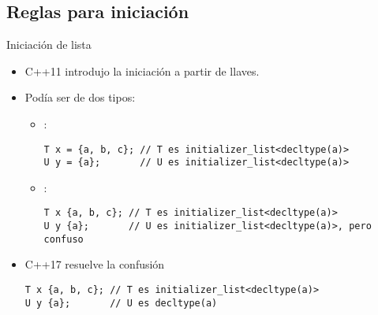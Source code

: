 \subsection{Reglas para iniciación}

\begin{frame}[t,fragile]{Iniciación de lista}
\begin{itemize}
  \item C++11 introdujo la iniciación a partir de llaves.
  \item Podía ser de dos tipos:
    \begin{itemize}
      \item {}:
\begin{lstlisting}
T x = {a, b, c}; // T es initializer_list<decltype(a)>
U y = {a};       // U es initializer_list<decltype(a)> 
\end{lstlisting}
      \item {}:
\begin{lstlisting}
T x {a, b, c}; // T es initializer_list<decltype(a)>
U y {a};       // U es initializer_list<decltype(a)>, pero confuso
\end{lstlisting}
    \end{itemize}
  \vfill\pause
  \item C++17 resuelve la confusión
\begin{lstlisting}
T x {a, b, c}; // T es initializer_list<decltype(a)>
U y {a};       // U es decltype(a)
\end{lstlisting}
\end{itemize}
\end{frame}  
